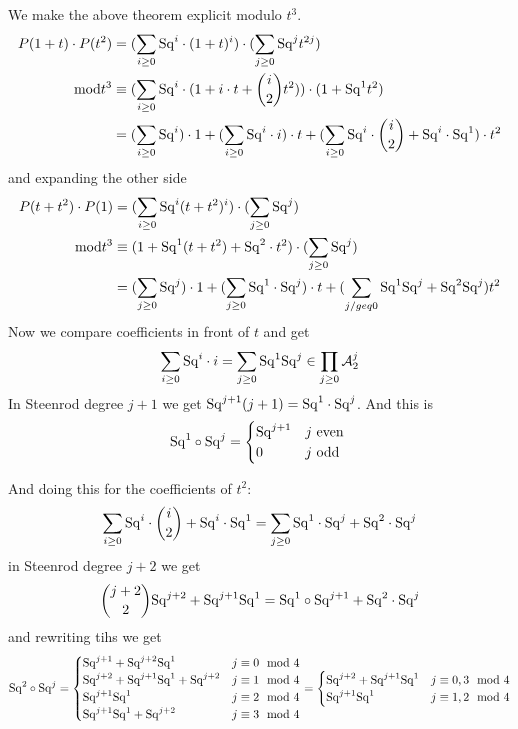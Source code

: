 \documentclass[language=english]{TemplateLecture}
\begin{document}
We make the above theorem explicit modulo \(t^3\).
\[\begin{split}
    P(1+t) \cdot P(t^2) &= (\sum_{i \geq 0} \mathrm{Sq}^i\cdot (1+t)^i)\cdot (\sum_{j\geq 0} \mathrm{Sq}^j t^{2j}) \\
    \mathrm{mod} t^3 &\equiv (\sum_{i \geq 0} \mathrm{Sq}^{i} \cdot (1 + i\cdot t + \binom{i}{2}t^2))\cdot (1 + \mathrm{Sq}^1 t^2) \\
    &= (\sum_{i \geq 0} \mathrm{Sq}^i) \cdot 1 + (\sum_{i \geq 0} \mathrm{Sq}^i \cdot i) \cdot t + (\sum_{i \geq 0} \mathrm{Sq}^i \cdot \binom{i }{2} + \mathrm{Sq}^i \cdot \mathrm{Sq}^1) \cdot t^2
\end{split}\]
and expanding the other side
\[\begin{split}
    P(t+t^2) \cdot P(1) &= (\sum_{i \geq 0} \mathrm{Sq}^i(t+t^2)^i) \cdot (\sum_{j \geq 0} \mathrm{Sq}^j) \\
    \mathrm{mod} t^3 &\equiv (1 + \mathrm{Sq}^1 (t+t^2) + \mathrm{Sq}^2 \cdot t^2) \cdot (\sum_{j\geq 0} \mathrm{Sq}^j) \\
    &= (\sum_{j\geq 0} \mathrm{Sq}^j) \cdot 1 + (\sum_{j\geq 0} \mathrm{Sq}^1\cdot \mathrm{Sq}^j) \cdot t + (\sum_{j/geq 0} \mathrm{Sq}^1 \mathrm{Sq}^j + \mathrm{Sq}^2 \mathrm{Sq}^j) t^2
\end{split}\]
Now we compare coefficients in front of \(t\) and get
\[\sum_{i\geq 0}\mathrm{Sq}^i \cdot i = \sum_{j \geq 0} \mathrm{Sq}^1 \mathrm{Sq}^j \in \prod_{j\geq 0} \mathcal{A}_2^j\]
In Steenrod degree \(j+1\) we get \(\mathrm{Sq}^{j+1}(j+1) = \mathrm{Sq}^1 \cdot \mathrm{Sq}^j\). And this is
\[\mathrm{Sq}^1 \circ \mathrm{Sq}^j = \begin{cases}
    \mathrm{Sq}^{j+1} & j \text{ even } \\
    0 & j \text{ odd } \\
\end{cases}\]

And doing this for the coefficients of \(t^2\):
\[\sum_{i\geq 0} \mathrm{Sq}^i \cdot \binom{i }{2} + \mathrm{Sq}^i \cdot \mathrm{Sq}^1 = \sum_{j \geq 0} \mathrm{Sq}^1 \cdot\mathrm{Sq}^j + \mathrm{Sq}^2\cdot \mathrm{Sq}^j\]
in Steenrod degree \(j+2\) we get
\[\binom{j+2}{2} \mathrm{Sq}^{j+2} + \mathrm{Sq}^{j+1}\mathrm{Sq}^1 = \mathrm{Sq}^1 \circ \mathrm{Sq}^{j+1}+ \mathrm{Sq}^2\cdot\mathrm{Sq}^{j}\]
and rewriting tihs we get
\[\mathrm{Sq}^2 \circ \mathrm{Sq}^j = \begin{cases}
    \mathrm{Sq}^{j+1} + \mathrm{Sq}^{j+2}\mathrm{Sq}^1 & j \equiv 0 \mod 4 \\
    \mathrm{Sq}^{j+2} + \mathrm{Sq}^{j+1}\mathrm{Sq}^1 + \mathrm{Sq}^{j+2} & j \equiv 1 \mod 4 \\
    \mathrm{Sq}^{j+1}\mathrm{Sq}^1 & j \equiv 2 \mod 4 \\
    \mathrm{Sq}^{j+1}\mathrm{Sq}^1+ \mathrm{Sq}^{j+2} & j \equiv 3 \mod 4 \\
\end{cases} = \begin{cases}
    \mathrm{Sq}^{j+2}+ \mathrm{Sq}^{j+1}\mathrm{Sq}^1 & j\equiv 0,3 \mod 4 \\
    \mathrm{Sq}^{j+1}\mathrm{Sq}^1 & j \equiv 1,2 \mod 4 \\
\end{cases}\]
\end{document}
